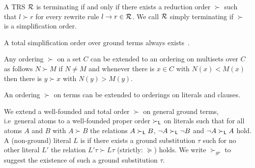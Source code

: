 \begin{theorem}
	A TRS \( \mathcal{R} \) is terminating if and only if there exists a reduction order \( \succ \)
	such that \( l\succ r \) for every rewrite rule \( l\rightarrow r\in\mathcal{R} \).
	We call \( \mathcal{R} \) simply terminating if \( \succ \) is a simplification order.
\end{theorem}


\begin{lemma}
    A total simplification order
    over ground terms always exists~\cite{NR2001}.
\end{lemma}


\begin{lemma}
	Any ordering \( \succ \) on a set \( C \) can be extended to an ordering on multisets over \( C \)
	as follows \( N \succ M \) if \( N \neq M \)
	and whenever there is \( x\in C \) with \( N(x) < M(x) \)
	then there is \( y \succ x \) with \( N(y) > M(y) \).

	An ordering \( \succ \) on terms can be extended to orderings on literals and clauses.
\end{lemma}






	\begin{definition}\label{def:orders-on-literals}
		We extend a well-founded and total order \( \succ \) on general ground terms,
		i.e~general atoms to a well-founded proper order \( \succ_{\mathsf{L}} \)
		on literals such that for all atoms \( A \) and \( B \) with \( A\succ B \)
		the relations \( A\succ_{\mathsf{L}} B \),
		\( \lnot A\succ_{\mathsf{L}}\lnot B \) and
		\( \lnot A\succ_{\mathsf{L}} A \) hold.
		A (non-ground) literal \( L \) is  if there exists a ground substitution \( \tau \)
		such for no other literal \( L' \) the relation \( L'\tau\succ L\tau \) (strictly: \( \succcurlyeq \)) holds.
		We write \( \succ_{gr} \) to suggest the existence of such a ground substitution \( \tau \).
	\end{definition}



%





